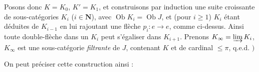 \documentclass[11pt]{article}
\newcommand{\Ob}{\operatorname{Ob}}
\newcommand{\limind}{\varinjlim}
\begin{document}
Posons donc $K = K_0$, $K' = K_1$, et construisons par induction une suite croissante de sous-catégories $K_i$ ($i \in \mathbf{N}$), avec $\Ob K_i = \Ob J$, et (pour $i \geqslant 1$) $K_i$ étant déduites de $K_{i-1}$ en lui rajoutant une flèche $p_i : e \longrightarrow e$, comme ci-dessus. Ainsi toute double-flèche dans un $K_i$ peut s'égaliser dans $K_{i+1}$. Prenons $K_\infty = \limind K_i$, $K_\infty$ est une sous-catégorie \textit{filtrante} de $J$, contenant $K$ et de cardinal $\leqslant \pi$, q.e.d. $\Biggr)$

On peut préciser cette construction ainsi :
\end{document}
